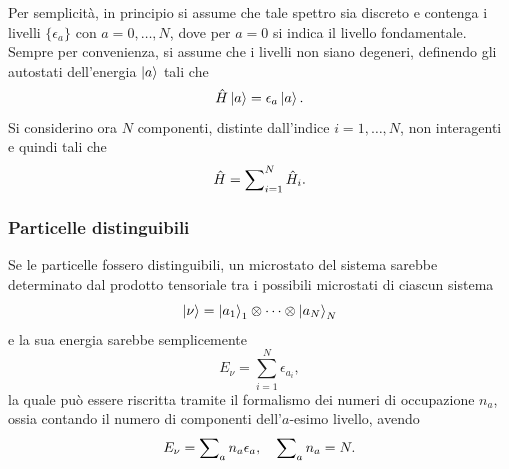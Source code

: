 Per semplicità, in principio si assume che tale spettro sia discreto e contenga i livelli $\{\epsilon_a\}$ con $a = 0,\dots,N$, dove per $a = 0$ si indica il livello fondamentale. Sempre per convenienza, si assume che i livelli non siano degeneri, definendo gli autostati dell'energia $\ket{a}$ tali che
\begin{equation}
    \hat{H}\ket{a} = \epsilon_a\ket{a}.
\end{equation}
Si considerino ora $N$ componenti, distinte dall'indice $i= 1,\dots,N$, non interagenti e quindi tali che
\begin{equation}
    \hat{H} = \sum\nolimits_{i=1}^N\hat{H}_i.
\end{equation}

\subsubsection{Particelle distinguibili}
Se le particelle fossero distinguibili, un microstato del sistema sarebbe determinato dal prodotto tensoriale tra i possibili microstati di ciascun sistema
\begin{equation}
    \ket{\nu} = \ket{a_1}_1 \otimes \cdots \otimes \ket{a_N}_N
\end{equation}
e la sua energia sarebbe semplicemente
\begin{equation}
    E_\nu = \sum_{i=1}^N\epsilon_{a_i},
\end{equation}
la quale può essere riscritta tramite il formalismo dei numeri di occupazione $n_a$, ossia contando il numero di componenti dell'$a$-esimo livello, avendo
\begin{equation}
    E_\nu = \sum\nolimits_an_a\epsilon_a,\quad \sum\nolimits_an_a = N.
\end{equation}

